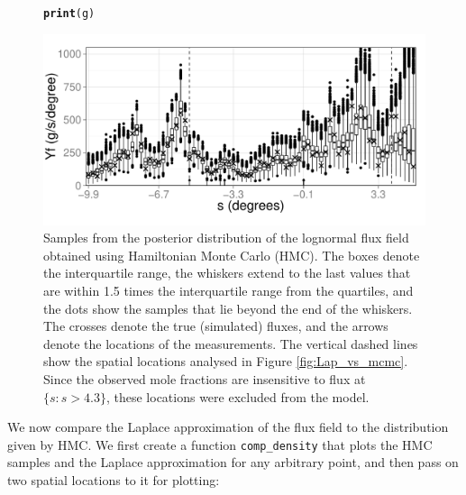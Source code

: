 \documentclass[a4paper,11pt]{article}\usepackage[]{graphicx}\usepackage[]{color}
\makeatletter
\def\maxwidth{ %
  \ifdim\Gin@nat@width>\linewidth
    \linewidth
  \else
    \Gin@nat@width
  \fi
}
\newcommand{\hlstd}[1]{\textcolor[rgb]{0.345,0.345,0.345}{#1}}%
\newcommand{\hlkwd}[1]{\textcolor[rgb]{0.737,0.353,0.396}{\textbf{#1}}}%
\newenvironment{kframe}{%
 \def\at@end@of@kframe{}%
 \ifinner\ifhmode%
  \def\at@end@of@kframe{\end{minipage}}%
  \begin{minipage}{\columnwidth}%
 \fi\fi%
 \def\FrameCommand##1{\hskip\@totalleftmargin \hskip-\fboxsep
 \colorbox{shadecolor}{##1}\hskip-\fboxsep
     \hskip-\linewidth \hskip-\@totalleftmargin \hskip\columnwidth}%
 \MakeFramed {\advance\hsize-\width
   \@totalleftmargin\z@ \linewidth\hsize
   \@setminipage}}%
 {\par\unskip\endMakeFramed%
 \at@end@of@kframe}
\newenvironment{knitrout}{}{} %
\makeatother
\begin{document}
\begin{figure}
\begin{center}
\begin{knitrout}
\color{fgcolor}\begin{kframe}
\begin{alltt}
\hlkwd{print}\hlstd{(g)}
\end{alltt}
\end{kframe}
\includegraphics[width=\maxwidth]{figure/HMC-plot-1} 

\end{knitrout}
\end{center}
\caption{Samples from the posterior distribution of the lognormal flux field obtained using Hamiltonian Monte Carlo (HMC). The boxes denote the interquartile range, the whiskers extend to the last values that are within 1.5 times the interquartile range from the quartiles, and the dots show the samples that lie beyond the end of the whiskers. The crosses denote the true (simulated) fluxes, and the arrows denote the locations of the measurements. The vertical dashed lines show the spatial locations analysed in Figure \ref{fig:Lap_vs_mcmc}. Since the observed mole fractions are insensitive to flux at $\{s : s > 4.3\}$, these locations were excluded from the model.}
\label{fig:Slice}
\end{figure}

We now compare the Laplace approximation of the flux field to the distribution given by HMC. We first create a function \texttt{comp\_density} that plots the HMC samples and the Laplace approximation for any arbitrary point, and then pass on two spatial locations to it for plotting:
\end{document}
